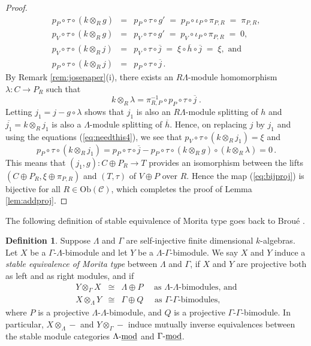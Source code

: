 \documentclass{amsart}
\theoremstyle{plain}
\theoremstyle{definition}
\newtheorem{dfn}[thm]{Definition}
\theoremstyle{remark}
\begin{document}
\begin{proof}
\begin{eqnarray}
\label{eq:needthis4}
p_P\circ\tau\circ(k\otimes_R g) &=& p_P\circ\tau \circ g' \;= \;p_P\circ\iota_P\circ\pi_{P,R}\;=\;\pi_{P,R},\\
p_V\circ\tau\circ(k\otimes_R g) &=& p_V\circ\tau\circ g'\;=\;p_V\circ\iota_P\circ\pi_{P,R}\;=\;0,\nonumber\\
p_V\circ\tau\circ(k\otimes_R j) &=& p_V\circ\tau\circ\overline{j} \;=\;\xi\circ\overline{h}\circ\overline{j}\;=\; \xi,\mbox{ and}\nonumber\\
p_P\circ\tau\circ(k\otimes_R j) &=& p_P\circ\tau\circ\overline{j} \,.\nonumber
\end{eqnarray}
By Remark \ref{rem:josepaper}(i), there exists an $R\Lambda$-module homomorphism $\lambda:C\to P_R$ such that
$$k\otimes_R\lambda=\pi_{R,P}^{-1}\circ p_P\circ\tau\circ\overline{j}\;.$$
Letting $j_1=j-g\circ \lambda$ shows that $j_1$ is also an $R\Lambda$-module splitting of $h$ and
$\overline{j_1}=k\otimes_R j_1$ is also a $\Lambda$-module splitting of $\overline{h}$. Hence, on replacing $j$ by
$j_1$ and using the equations (\ref{eq:needthis4}), we see that
$p_V\circ\tau\circ(k\otimes_R j_1) = \xi$ and
$$p_P\circ\tau\circ(k\otimes_R j_1) = p_P\circ\tau\circ\overline{j}-p_P\circ\tau\circ (k\otimes_Rg)\circ(k\otimes_R\lambda)=0\,.$$
This means that $(j_1,g):  C\oplus P_R \to T$ provides an isomorphism between the lifts
$(C\oplus P_R,\xi\oplus \pi_{P,R})$ and $(T,\tau)$ of $V\oplus P$ over $R$. 
Hence the map (\ref{eq:bijproj}) is bijective for all $R\in\mathrm{Ob}(\mathcal{C})$, which 
completes the proof of Lemma \ref{lem:addproj}. 
\end{proof}

The following definition of stable equivalence of Morita type goes back to Brou\'{e} \cite{broue1}.

\begin{dfn}
\label{def:stabeq} 
Suppose $\Lambda$ and $\Gamma$ are self-injective finite dimensional $k$-algebras.
Let $X$ be a $\Gamma$-$\Lambda$-bimodule and let $Y$ be a $\Lambda$-$\Gamma$-bimodule. 
We say $X$ and $Y$ induce a \emph{stable equivalence of Morita type} between $\Lambda$ and 
$\Gamma$, if $X$ and $Y$ are projective both as left and as right modules, and if 
\begin{eqnarray}
\label{eq:stab}
Y\otimes_{\Gamma}X&\cong& \Lambda\oplus P \quad\mbox{ as $\Lambda$-$\Lambda$-bimodules, and} \\ 
\nonumber
X\otimes_{\Lambda}Y&\cong& \Gamma\oplus Q \quad\mbox{ as $\Gamma$-$\Gamma$-bimodules}, 
\end{eqnarray}
where $P$ is a projective $\Lambda$-$\Lambda$-bimodule, and $Q$ is a projective 
$\Gamma$-$\Gamma$-bimodule.
In particular, $X\otimes_{\Lambda}-$ and $Y\otimes_{\Gamma}-$ induce mutually inverse 
equivalences between the stable module categories $\Lambda\mbox{-\underline{mod}}$ and 
$\Gamma\mbox{-\underline{mod}}$.
\end{dfn}
\end{document}
